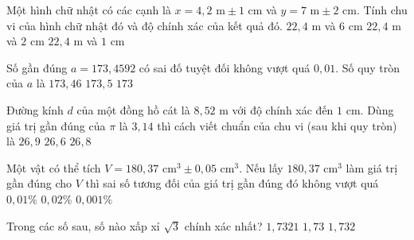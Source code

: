 \begin{ex}%
	Một hình chữ nhật có các cạnh là $x= 4,2 \text{ m} \pm 1 \text{\ cm}$ và $y = 7 \text{\ m} \pm 2 \text{\ cm}$. Tính chu vi của hình chữ nhật đó và độ chính xác của kết quả đó. 
	{\True $22,4 \text{\ m}$ và $6 \text{\ cm}$}
	{$22,4\text{\ m}$ và $2 \text{\ cm}$}
	{$22,4\text{\ m}$ và $1 \text{\ cm}$}
\end{ex}

\begin{ex}%
	Số gần đúng $a = 173, 4592$ có sai đố tuyệt đối không vượt quá $0,01$. Số quy tròn của $a$ là 
	{$173, 46$}
	{\True $173, 5$}
	{$173$}
\end{ex}

\begin{ex}%
	Đường kính $d$ của một đồng hồ cát là $8,52 \text{\ m}$ với độ chính xác đến $1 \text{\ cm}$. Dùng giá trị gần đúng của $\pi$ là $3,14$ thì cách viết chuẩn của chu vi (sau khi quy tròn) là 
	{$26, 9$}
	{$26,6$}
	{\True $26, 8$}
\end{ex}

\begin{ex}%
	Một vật có thể tích $V = 180, 37 \text{\ cm}^3 \pm 0,05 \text{\ cm}^3$. Nếu lấy $180, 37 \text{\ cm}^3$ làm giá trị gần đúng cho $V$ thì sai số tương đối của giá trị gần đúng đó không vượt quá 
	{$0, 01 \%$}
	{$0, 02 \%$}
	{$0, 001 \%$}
\end{ex}

\begin{ex}%
	Trong các số sau, số nào xấp xỉ $\sqrt{3}$ chính xác nhất? 
	{\True $1, 7321$}
	{$1, 73$}
	{$1, 732$}
\end{ex}

